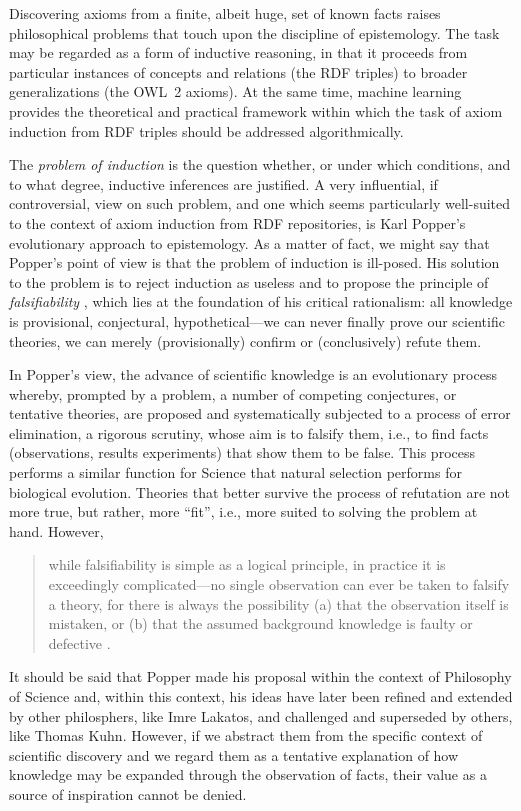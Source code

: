 \documentclass[a4paper]{article}
\newcounter{ex}
\begin{document}
Discovering axioms from a finite, albeit huge, set of known facts
raises philosophical problems that touch upon the discipline of epistemology.
The task may be regarded as a form of inductive reasoning, in that it proceeds
from particular instances of concepts and relations (the RDF triples)
to broader generalizations (the OWL~2 axioms).
At the same time, machine learning provides the theoretical and practical
framework within which the task of axiom induction from RDF triples
should be addressed algorithmically.

The \emph{problem of induction} is the question whether, or under which conditions,
and to what degree, inductive inferences are justified.
A very influential, if controversial, view on such problem, and one which seems
particularly well-suited to the context of axiom induction from RDF repositories,
is Karl Popper's evolutionary approach to epistemology. As a matter of fact,
we might say that Popper's point of view is that the problem of induction is ill-posed.
His solution to the problem is to reject induction as useless and to propose the principle
of \emph{falsifiability} \cite{Popper1935}, which lies at the foundation of his critical rationalism:
all knowledge is provisional, conjectural, hypothetical---we can never finally
prove our scientific theories, we can merely (provisionally) confirm or
(conclusively) refute them.

In Popper's view, the advance of scientific knowledge is an evolutionary process~\cite{Popper1972}
whereby, prompted by a problem, a number of competing conjectures, or tentative theories,
are proposed and systematically subjected to a process of error elimination,
a rigorous scrutiny, whose aim is to falsify them, i.e., to find facts (observations,
results experiments) that show them to be false.
This process performs a similar function for Science that natural selection performs
for biological evolution. Theories that better survive the process of refutation
are not more true, but rather, more ``fit'', i.e., more suited to solving
the problem at hand.
However,
\begin{quote}
while falsifiability is simple as a logical principle, in practice it is exceedingly
complicated---no single observation can ever be taken to falsify a theory,
for there is always the possibility (a) that the observation itself is mistaken,
or (b) that the assumed background knowledge is faulty or defective \cite{Thornton2013}.
\end{quote}

It should be said that Popper made his proposal within the context of Philosophy of Science
and, within this context, his ideas have later been refined and extended by other
philosphers, like Imre Lakatos, and challenged and superseded by others, like Thomas Kuhn.
However, if we abstract them from the specific context of scientific discovery
and we regard them as a tentative explanation of how knowledge may be expanded
through the observation of facts, their value as a source of inspiration cannot be denied.
\end{document}
